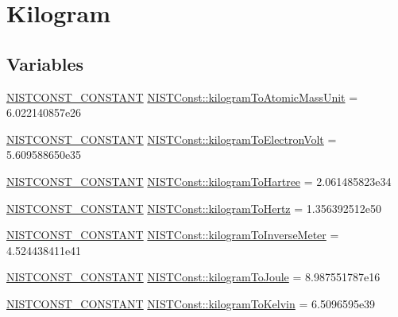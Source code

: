 \hypertarget{group___n_i_s_t_const-_kilogram}{}\section{Kilogram}
\label{group___n_i_s_t_const-_kilogram}
\subsection*{Variables}
\begin{DoxyCompactItemize}
\item 
\mbox{\hyperlink{group___n_i_s_t_const-_macros_ga2b0fc1d7452373f816175dd86ce26729}{N\+I\+S\+T\+C\+O\+N\+S\+T\+\_\+\+C\+O\+N\+S\+T\+A\+NT}} \mbox{\hyperlink{group___n_i_s_t_const-_kilogram_ga35f254bf103cee35787785371c8c87b9}{N\+I\+S\+T\+Const\+::kilogram\+To\+Atomic\+Mass\+Unit}} = 6.\+022140857e26
\item 
\mbox{\hyperlink{group___n_i_s_t_const-_macros_ga2b0fc1d7452373f816175dd86ce26729}{N\+I\+S\+T\+C\+O\+N\+S\+T\+\_\+\+C\+O\+N\+S\+T\+A\+NT}} \mbox{\hyperlink{group___n_i_s_t_const-_kilogram_gaf4c85de736c542b75e716d4331d7f324}{N\+I\+S\+T\+Const\+::kilogram\+To\+Electron\+Volt}} = 5.\+609588650e35
\item 
\mbox{\hyperlink{group___n_i_s_t_const-_macros_ga2b0fc1d7452373f816175dd86ce26729}{N\+I\+S\+T\+C\+O\+N\+S\+T\+\_\+\+C\+O\+N\+S\+T\+A\+NT}} \mbox{\hyperlink{group___n_i_s_t_const-_kilogram_ga86871a9bebdacc0ba4cc0cb499f6bdde}{N\+I\+S\+T\+Const\+::kilogram\+To\+Hartree}} = 2.\+061485823e34
\item 
\mbox{\hyperlink{group___n_i_s_t_const-_macros_ga2b0fc1d7452373f816175dd86ce26729}{N\+I\+S\+T\+C\+O\+N\+S\+T\+\_\+\+C\+O\+N\+S\+T\+A\+NT}} \mbox{\hyperlink{group___n_i_s_t_const-_kilogram_ga325ee7a73343aa0c17859614e9c312bd}{N\+I\+S\+T\+Const\+::kilogram\+To\+Hertz}} = 1.\+356392512e50
\item 
\mbox{\hyperlink{group___n_i_s_t_const-_macros_ga2b0fc1d7452373f816175dd86ce26729}{N\+I\+S\+T\+C\+O\+N\+S\+T\+\_\+\+C\+O\+N\+S\+T\+A\+NT}} \mbox{\hyperlink{group___n_i_s_t_const-_kilogram_gab05120ad69913df2e0ad5370c1d74d98}{N\+I\+S\+T\+Const\+::kilogram\+To\+Inverse\+Meter}} = 4.\+524438411e41
\item 
\mbox{\hyperlink{group___n_i_s_t_const-_macros_ga2b0fc1d7452373f816175dd86ce26729}{N\+I\+S\+T\+C\+O\+N\+S\+T\+\_\+\+C\+O\+N\+S\+T\+A\+NT}} \mbox{\hyperlink{group___n_i_s_t_const-_kilogram_ga68c270fa806d2f2704e80325a51962bb}{N\+I\+S\+T\+Const\+::kilogram\+To\+Joule}} = 8.\+987551787e16
\item 
\mbox{\hyperlink{group___n_i_s_t_const-_macros_ga2b0fc1d7452373f816175dd86ce26729}{N\+I\+S\+T\+C\+O\+N\+S\+T\+\_\+\+C\+O\+N\+S\+T\+A\+NT}} \mbox{\hyperlink{group___n_i_s_t_const-_kilogram_ga9af74a62fa2240b7454d7340d13bb885}{N\+I\+S\+T\+Const\+::kilogram\+To\+Kelvin}} = 6.\+5096595e39
\end{DoxyCompactItemize}


